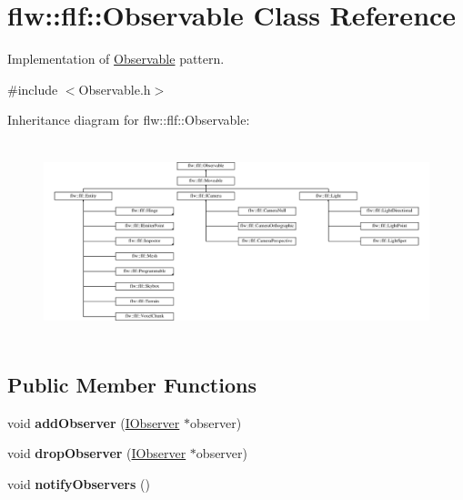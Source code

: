 \hypertarget{classflw_1_1flf_1_1Observable}{}\section{flw\+:\+:flf\+:\+:Observable Class Reference}
\label{classflw_1_1flf_1_1Observable}


Implementation of \hyperlink{classflw_1_1flf_1_1Observable}{Observable} pattern.  




{\ttfamily \#include $<$Observable.\+h$>$}

Inheritance diagram for flw\+:\+:flf\+:\+:Observable\+:\begin{figure}[H]
\begin{center}
\leavevmode
\includegraphics[height=5.767790cm]{classflw_1_1flf_1_1Observable}
\end{center}
\end{figure}
\subsection*{Public Member Functions}
\begin{DoxyCompactItemize}
\item 
void {\bfseries add\+Observer} (\hyperlink{classflw_1_1flf_1_1IObserver}{I\+Observer} $\ast$observer)\hypertarget{classflw_1_1flf_1_1Observable_a114471ead1708a2cf2256d06f950f717}{}\label{classflw_1_1flf_1_1Observable_a114471ead1708a2cf2256d06f950f717}

\item 
void {\bfseries drop\+Observer} (\hyperlink{classflw_1_1flf_1_1IObserver}{I\+Observer} $\ast$observer)\hypertarget{classflw_1_1flf_1_1Observable_ab75a0a721f82c3805fe4deac25e67375}{}\label{classflw_1_1flf_1_1Observable_ab75a0a721f82c3805fe4deac25e67375}

\item 
void {\bfseries notify\+Observers} ()\hypertarget{classflw_1_1flf_1_1Observable_ae382cc5ffd147028a0357687c3ab4a40}{}\label{classflw_1_1flf_1_1Observable_ae382cc5ffd147028a0357687c3ab4a40}

\end{DoxyCompactItemize}
